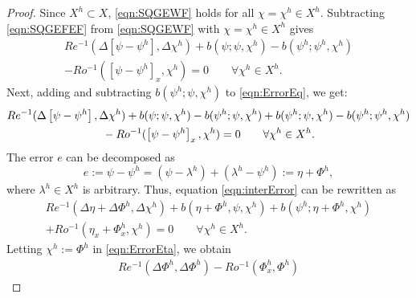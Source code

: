 \begin{proof}
  Since $X^h \subset X$, \eqref{eqn:SQGEWF} holds for all $\chi = \chi^h\in X^h$.
  Subtracting \eqref{eqn:SQGEFEF} from \eqref{eqn:SQGEWF} with $\chi=\chi^h \in
  X^h$ gives
  \begin{equation}
    \begin{split}
      Re^{-1}\left(\Delta \left[\psi - \psi^h\right],\Delta \chi^h \right)
        + b(\psi;\psi,\chi^h) - b(\psi^h;\psi^h,\chi^h) \\
        - Ro^{-1} \left(\left[\psi-\psi^h\right]_x,\chi^h\right) = 0 \qquad \forall \chi^h \in
    X^h.
  \end{split}
    \label{eqn:ErrorEq}
  \end{equation}
  Next, adding and subtracting $b(\psi^h;\psi,\chi^h)$ to \eqref{eqn:ErrorEq},
  we get:
  \begin{equation}
    \begin{split}
      & Re^{-1} (\Delta \left[\psi - \psi^h\right], \Delta \chi^h)
        + b(\psi;\psi,\chi^h) - b(\psi^h;\psi,\chi^h) %
        + b(\psi^h;\psi,\chi^h) - b(\psi^h;\psi^h,\chi^h) \\
      & \hspace*{3.0cm} - Ro^{-1} (\left[\psi-\psi^h\right]_x,\chi^h) = 0
        \qquad \forall \chi^h \in X^h.
    \end{split}
    \label{eqn:interError}
  \end{equation}
  The error $e$ can be decomposed as
  \begin{equation}
    e:= \psi-\psi^h = (\psi-\lambda^h)+(\lambda^h-\psi^h):= \eta + \Phi^h,
    \label{eqn:ErrorTrick}
  \end{equation}
  where $\lambda^h\in X^h$ is arbitrary.
  Thus, equation \eqref{eqn:interError} can be
  rewritten as
  \begin{equation}
    \begin{split}
      Re^{-1}(\Delta \eta + \Delta \Phi^h, \Delta \chi^h)
        + b(\eta+\Phi^h,\psi,\chi^h) + b(\psi^h;\eta+\Phi^h,\chi^h) \\
      + Ro^{-1} (\eta_x+\Phi^h_x,\chi^h) = 0 \qquad \forall \chi^h \in X^h.
    \end{split}
    \label{eqn:ErrorEta}
  \end{equation}
  Letting $\chi^h := \Phi^h$ in \eqref{eqn:ErrorEta}, we obtain
  \begin{equation}
    \begin{split}
      Re^{-1} (\Delta \Phi^h, \Delta \Phi^h) - Ro^{-1} (\Phi^h_x,\Phi^h)

\end{split}
\end{equation}
\end{proof}
